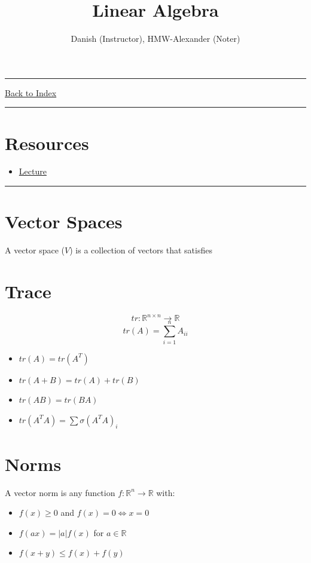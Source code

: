\documentclass[letterpaper,10pt]{article}
\title{\textbf{Linear Algebra}}
\author{Danish (Instructor), HMW-Alexander (Noter)}
\newcommand{\panhline}{\begin{center}\rule{\textwidth}{1pt}\end{center}}
\begin{document}
\maketitle

\panhline
\href{../index.html}{Back to Index}

\panhline
\tableofcontents

\section*{Resources}

\begin{itemize}
	\item \href{../../Lectures/R2_LinearAlgebra.pdf}{Lecture}
\end{itemize}

\panhline

\section{Vector Spaces}

A vector space ($V$) is a collection of vectors that satisfies 

\section{Trace}

$$tr: \mathbb{R}^{n\times n} \rightarrow \mathbb{R}$$
$$tr(A)=\sum_{i=1}^{n}A_{ii}$$

\begin{itemize}
	\item $tr(A)=tr(A^T)$
	\item $tr(A+B)=tr(A)+tr(B)$
	\item $tr(AB)=tr(BA)$
	\item $tr(A^TA)=\sum{\sigma(A^TA)_i}$
\end{itemize}

\section{Norms}

A vector norm is any function $f: \mathbb{R}^n \rightarrow \mathbb{R}$ with:
\begin{itemize}
	\item $f(x)\geq 0$ and $f(x)=0 \Leftrightarrow x=0$
	\item $f(ax)=|a|f(x)$ for $a\in \mathbb{R}$
	\item $f(x+y)\leq f(x)+f(y)$
\end{itemize}
\end{document}
